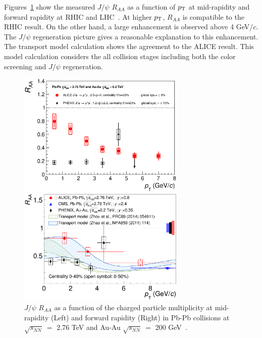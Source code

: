 Figures~\ref{fig_2_raapt} show the measured $J/\psi$ $R_{AA}$ as a function of $p_{\rm{T}}$ at mid-rapidity and forward rapidity at RHIC and LHC~\cite{bib_alicejpsiraa,bib_alicejpsiraamid}.
At higher $p_{\rm{T}}$, $R_{AA}$ is compatible to the RHIC result. 
On the other hand, a large enhancement is observed above 4 GeV/$c$.
The $J/\psi$ regeneration picture gives a reasonable explanation to this enhancement. 
The transport model calculation shows the agreement to the ALICE result. 
This model calculation considers the all collision stages including both the color screening and $J/\psi$ regeneration. 
\begin{figure}[!h]
  \begin{minipage}{0.5\hsize}
  \begin{center}
	\includegraphics[width=8cm]{chap2/figure/experimentaldata/RAAPtvsModels2-4514.eps}	  
    \end{center}
  \end{minipage}
  \begin{minipage}{0.5\hsize}
   \begin{center}
      \includegraphics[width=8cm]{chap2/figure/experimentaldata/Raa-Mpt-sysBar-compPHENIX-compCMS-tcompZhou-tcompZhao-13709.eps}
    \end{center}
  \end{minipage}
  \caption{
	$J/\psi$ $R_{AA}$ as a function of the charged particle multiplicity at mid-rapidity (Left) and forward rapidity (Right) in Pb-Pb collisions at $\sqrt{s_{NN}}~=$ 2.76 TeV and Au-Au $\sqrt{s_{NN}}~=$ 200 GeV~\cite{bib_alicejpsiraa,bib_alicejpsiraamid}.
   }
  \label{fig_2_raapt}
\end{figure}

